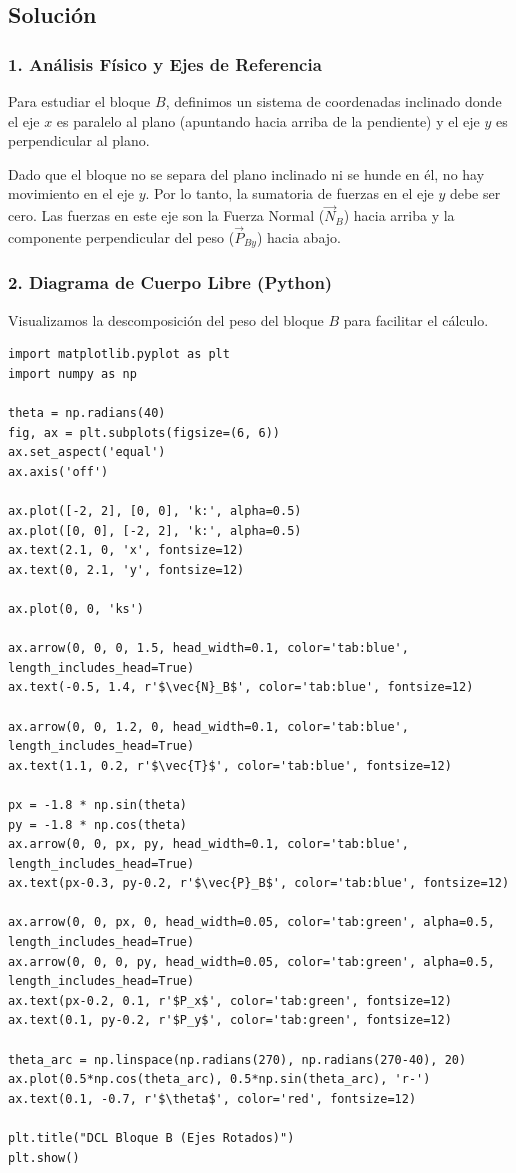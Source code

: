 \documentclass[12pt, a4paper]{article}
\begin{document}
\subsection*{Solución}

\subsubsection*{1. Análisis Físico y Ejes de Referencia}
Para estudiar el bloque $B$, definimos un sistema de coordenadas inclinado donde el eje $x$ es paralelo al plano (apuntando hacia arriba de la pendiente) y el eje $y$ es perpendicular al plano.

Dado que el bloque no se separa del plano inclinado ni se hunde en él, no hay movimiento en el eje $y$. Por lo tanto, la sumatoria de fuerzas en el eje $y$ debe ser cero. Las fuerzas en este eje son la Fuerza Normal ($\vec{N}_B$) hacia arriba y la componente perpendicular del peso ($\vec{P}_{By}$) hacia abajo.

\subsubsection*{2. Diagrama de Cuerpo Libre (Python)}
Visualizamos la descomposición del peso del bloque $B$ para facilitar el cálculo.

\begin{lstlisting}
import matplotlib.pyplot as plt
import numpy as np

theta = np.radians(40)
fig, ax = plt.subplots(figsize=(6, 6))
ax.set_aspect('equal')
ax.axis('off')

ax.plot([-2, 2], [0, 0], 'k:', alpha=0.5)
ax.plot([0, 0], [-2, 2], 'k:', alpha=0.5)
ax.text(2.1, 0, 'x', fontsize=12)
ax.text(0, 2.1, 'y', fontsize=12)

ax.plot(0, 0, 'ks')

ax.arrow(0, 0, 0, 1.5, head_width=0.1, color='tab:blue', length_includes_head=True)
ax.text(-0.5, 1.4, r'$\vec{N}_B$', color='tab:blue', fontsize=12)

ax.arrow(0, 0, 1.2, 0, head_width=0.1, color='tab:blue', length_includes_head=True)
ax.text(1.1, 0.2, r'$\vec{T}$', color='tab:blue', fontsize=12)

px = -1.8 * np.sin(theta)
py = -1.8 * np.cos(theta)
ax.arrow(0, 0, px, py, head_width=0.1, color='tab:blue', length_includes_head=True)
ax.text(px-0.3, py-0.2, r'$\vec{P}_B$', color='tab:blue', fontsize=12)

ax.arrow(0, 0, px, 0, head_width=0.05, color='tab:green', alpha=0.5, length_includes_head=True)
ax.arrow(0, 0, 0, py, head_width=0.05, color='tab:green', alpha=0.5, length_includes_head=True)
ax.text(px-0.2, 0.1, r'$P_x$', color='tab:green', fontsize=12)
ax.text(0.1, py-0.2, r'$P_y$', color='tab:green', fontsize=12)

theta_arc = np.linspace(np.radians(270), np.radians(270-40), 20)
ax.plot(0.5*np.cos(theta_arc), 0.5*np.sin(theta_arc), 'r-')
ax.text(0.1, -0.7, r'$\theta$', color='red', fontsize=12)

plt.title("DCL Bloque B (Ejes Rotados)")
plt.show()
\end{lstlisting}
\end{document}
